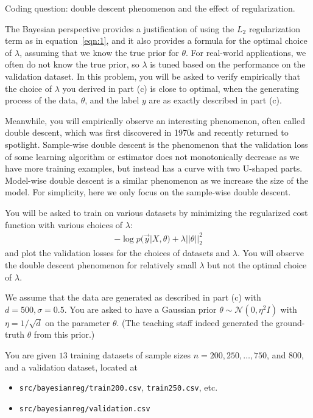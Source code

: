\item {} Coding question:  double descent phenomenon and the effect of regularization. 

The Bayesian perspective provides a justification of using the $L_2$ regularization term as in equation~\eqref{eqn:1}, and it also provides a formula for the optimal choice of $\lambda$, assuming that we know the true prior for $\theta$. For real-world applications, we often do not know the true prior, so $\lambda$ is tuned based on the performance on the validation dataset. In this problem, you will be asked to verify empirically that  the choice of $\lambda$ you derived in part (c) is close to optimal, when the generating process of the data, $\theta$, and the label $y$ are as exactly described in part (c). 

Meanwhile, you will empirically observe an interesting phenomenon, often called double descent, which was first discovered in 1970s and recently returned to spotlight. Sample-wise double descent is the phenomenon that the validation loss of some learning algorithm or estimator does not monotonically decrease as we have more training examples, but instead has a curve with two U-shaped parts. Model-wise double descent is a similar phenomenon as we increase the size of the model. For simplicity, here we only focus on the sample-wise double descent.  

You will be asked to train on various datasets by minimizing the regularized cost function with various choices of $\lambda$: 
\begin{align}
- \log p(\vec{y}|X,\theta) + \lambda||\theta||^2_2 \label{eqn:3}
\end{align}
and plot the validation losses for the choices of datasets and $\lambda$. You will observe the double descent phenomenon for relatively small $\lambda$ but not the optimal choice of $\lambda.$

 We assume that the data are generated as described in part (c) with $d=500, \sigma=0.5$. You are asked to have a Gaussian prior $\theta \sim \mathcal{N}(0,\eta^2 I)$ with $\eta=1/\sqrt{d}$ on the parameter $\theta$. (The teaching staff indeed generated the ground-truth $\theta$ from this prior.) 

You are given $13$ training datasets of sample sizes $n  = 200, 250, \dots, 750$, and $800$, and a validation dataset, located at
\begin{itemize}
	\item \texttt{src/bayesianreg/train200.csv}, \texttt{train250.csv}, etc.
	\item \texttt{src/bayesianreg/validation.csv}
\end{itemize} 

